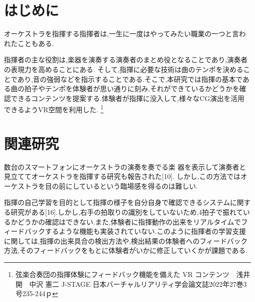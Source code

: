 \documentclass[uplatex]{jsarticle}   %
\begin{document}

\vspace{3mm}

\setcounter{page}{9}


\section{はじめに}
オーケストラを指揮する指揮者は,一生に一度はやってみたい職業の一つと言われたこともある\cite{1}.

指揮者の主な役割は,楽器を演奏する演奏者のまとめ役となることであり,演奏者の表現力を高めることにある.
そして,指揮に必要な技術は曲のテンポを決めることであり,音の強弱などを指示することである\cite{2}.そこで,本研究では指揮の基本である曲の拍子やテンポを体験者が思い通りに刻み,それができているかどうかを確認できるコンテンツを提案する.体験者が指揮に没入して,様々なCG演出を活用できるようVR空間を利用した.
\footnote{弦楽合奏団の指揮体験にフィードバック機能を備えた VR コンテンツ　浅井 開　中沢 憲二
J-STAGE 日本バーチャルリアリティ学会論文誌2022年27巻3号235-244ｐ
}
\section{関連研究}
数台のスマートフォンにオーケストラの演奏を奏でる楽 器を表示して演奏者と見立ててオーケストラを指揮する研究も報告された[10].
しかし,この方法ではオーケストラを目の前にしているという臨場感を得るのは難しい.

指揮の自己学習を目的として指揮の様子を自分自身で確認できるシステムに関する研究がある[16].しかし,右手の拍取りの識別をしていないため,4拍子で振れているかどうかの確認はできない.また,体験者に指揮動作の出来をリアルタイムでフィードバックするような機能も実装されていない.このように指揮者の学習支援に関しては,指揮の出来具合の検出方法や,検出結果の体験者へのフィードバック方法,そのフィードバックをもとに体験者がいかに修正していくかが課題である.

\end{document}
